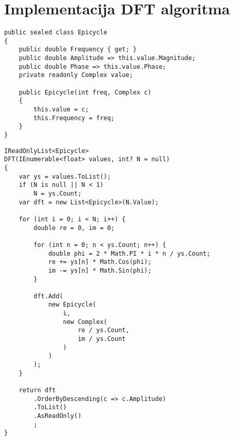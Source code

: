 \section{Implementacija DFT algoritma}
\label{sec:appendix:dft}

\begin{lstlisting}
public sealed class Epicycle
{
    public double Frequency { get; }
    public double Amplitude => this.value.Magnitude;
    public double Phase => this.value.Phase;
    private readonly Complex value;

    public Epicycle(int freq, Complex c)
    {
        this.value = c;
        this.Frequency = freq;
    }
}
\end{lstlisting}

\begin{lstlisting}
IReadOnlyList<Epicycle> 
DFT(IEnumerable<float> values, int? N = null) 
{
    var ys = values.ToList();
    if (N is null || N < 1)
        N = ys.Count;
    var dft = new List<Epicycle>(N.Value);

    for (int i = 0; i < N; i++) {
        double re = 0, im = 0;

        for (int n = 0; n < ys.Count; n++) {
            double phi = 2 * Math.PI * i * n / ys.Count;
            re += ys[n] * Math.Cos(phi);
            im -= ys[n] * Math.Sin(phi);
        }

        dft.Add(
            new Epicycle(
                i, 
                new Complex(
                    re / ys.Count, 
                    im / ys.Count
                )
            )
        );
    }

    return dft
        .OrderByDescending(c => c.Amplitude)
        .ToList()
        .AsReadOnly()
        ;
}
\end{lstlisting}
